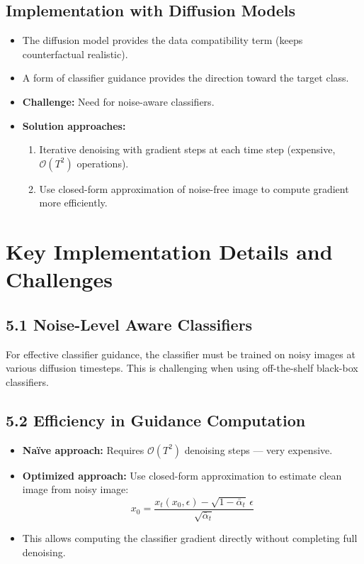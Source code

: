 \subsection*{Implementation with Diffusion Models}
\begin{itemize}
    \item The diffusion model provides the data compatibility term (keeps counterfactual realistic).
    \item A form of classifier guidance provides the direction toward the target class.
    \item \textbf{Challenge:} Need for noise-aware classifiers.
    \item \textbf{Solution approaches:}
    \begin{enumerate}
        \item Iterative denoising with gradient steps at each time step (expensive, $\mathcal{O}(T^2)$ operations).
        \item Use closed-form approximation of noise-free image to compute gradient more efficiently.
    \end{enumerate}
\end{itemize}

\section{Key Implementation Details and Challenges}

\subsection*{5.1 Noise-Level Aware Classifiers}
For effective classifier guidance, the classifier must be trained on noisy images at various diffusion timesteps. This is challenging when using off-the-shelf black-box classifiers.

\subsection*{5.2 Efficiency in Guidance Computation}
\begin{itemize}
    \item \textbf{Naïve approach:} Requires $\mathcal{O}(T^2)$ denoising steps — very expensive.
    \item \textbf{Optimized approach:} Use closed-form approximation to estimate clean image from noisy image:
    \[
    x_0 = \frac{x_t(x_0, \epsilon) - \sqrt{1 - \bar{\alpha}_t} \, \epsilon}{\sqrt{\bar{\alpha}_t}}
    \]
    \item This allows computing the classifier gradient directly without completing full denoising.
\end{itemize}
